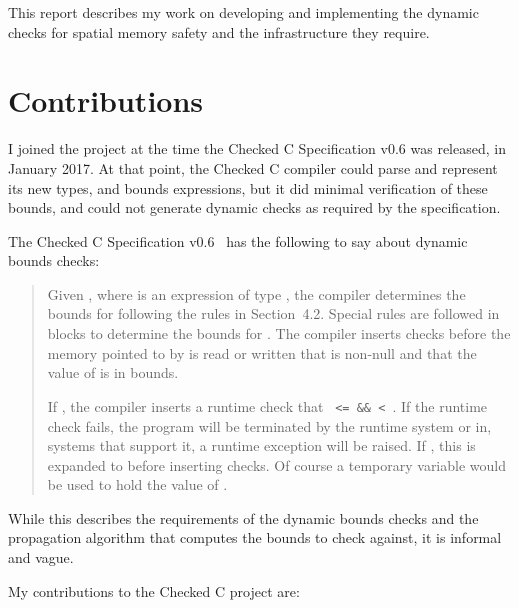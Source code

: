This report describes my work on developing and implementing the
dynamic checks for spatial memory safety and the infrastructure they
require.

\section{Contributions}

I joined the project at the time the Checked C Specification v0.6 was
released, in January 2017. At that point, the Checked C compiler could
parse and represent its new types, and bounds expressions, but it did
minimal verification of these bounds, and could not generate dynamic
checks as required by the specification.

\begin{minipage}{\textwidth}
The Checked C Specification v0.6~\cite{CheckedCv06} has the following
to say about dynamic bounds checks:
\begin{quotation}
Given , where  is an expression of type
, the compiler determines the bounds for 
following the rules in Section~4.2. Special rules are followed in
 blocks to determine the bounds for . The
compiler inserts checks before the memory pointed to by  is
read or written that  is non-null and that the value of 
is in bounds.

If , the compiler
inserts a runtime check that \texttt{ <=  \&\&  <
}. If the runtime check fails, the program will be terminated
by the runtime system or in, systems that support it, a runtime
exception will be raised. If
, this is expanded to
 before
inserting checks. Of course a temporary variable would be used to hold
the value of .
\end{quotation}

While this describes the requirements of the dynamic bounds checks and
the propagation algorithm that computes the bounds to check against,
it is informal and vague.
\end{minipage}

My contributions to the Checked C project are:

